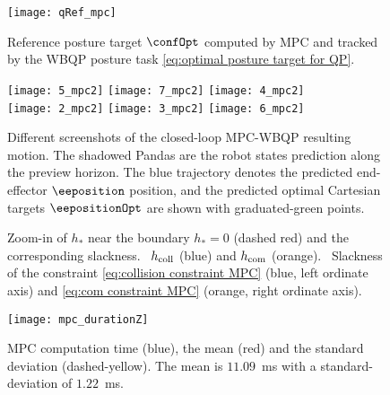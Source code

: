 \begin{figure}
	\centering
	\texttt{[image: qRef\_mpc]}
	\caption{Reference posture target $\confOpt$ computed by MPC and tracked by the WBQP posture task \cref{eq:optimal posture target for QP}.}
	\label{fig:optimal posture target MPC}
\end{figure}
\begin{figure}
	\centering
	\texttt{[image: 5\_mpc2]}
	\texttt{[image: 7\_mpc2]}
	\texttt{[image: 4\_mpc2]} \\
	\texttt{[image: 2\_mpc2]}
	\texttt{[image: 3\_mpc2]}
	\texttt{[image: 6\_mpc2]} 
\caption{Different screenshots of the closed-loop MPC-WBQP resulting motion. The shadowed Pandas are the robot states prediction along the preview horizon. The blue trajectory denotes the predicted end-effector $\eeposition$ position, and the predicted optimal Cartesian targets $\eepositionOpt$ are shown with graduated-green points.}
\label{fig:MPC-QP motion}
\end{figure}
\begin{figure}
	\centering
	\caption{Zoom-in of $h_{*}$ near the boundary $h_{*}=0$ (dashed red) and the corresponding slackness.~ $h_{\rm coll}$ (blue) and $h_{\rm com}$ (orange).~ Slackness of the constraint \cref{eq:collision constraint MPC} (blue, left ordinate axis) and \cref{eq:com constraint MPC} (orange, right ordinate axis).}
	\label{fig:hcoll and hcom MPC zoomed + slackness}
\end{figure}
\begin{figure}
	\centering
	\texttt{[image: mpc\_durationZ]}
	\caption{MPC computation time (blue), the mean (red) and the standard deviation (dashed-yellow). The mean is $11.09$~ms with a standard-deviation of $1.22$~ms.}
	\label{fig:mpc duration}
\end{figure}
